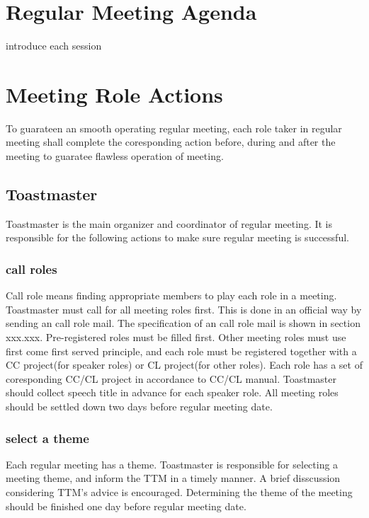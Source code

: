 \section{Regular Meeting Agenda}

introduce each session


\section{Meeting Role Actions}

To guarateen an smooth operating regular meeting, each role taker 
in regular meeting shall complete the coresponding action before,
during and after the meeting to guaratee flawless operation of 
meeting. 

\subsection{Toastmaster}

Toastmaster is the main organizer and coordinator of regular meeting. 
It is responsible for the following actions to make sure regular meeting 
is successful.

\subsubsection{call roles}

Call role means finding appropriate members to play each role in a meeting. 
Toastmaster must call for all meeting roles first. This is done in an official
way by sending an call role mail. The specification of an call role mail is shown
in section xxx.xxx. Pre-registered roles must be filled first. Other meeting roles
must use first come first served principle, and each role must be registered together
with a CC project(for speaker roles) or CL project(for other roles). Each role has 
a set of coresponding CC/CL project in accordance to CC/CL manual. Toastmaster 
should collect speech title in advance for each speaker role. All meeting roles
should be settled down two days before regular meeting date. 

\subsubsection{select a theme}
Each regular meeting has a theme. Toastmaster is responsible for selecting a meeting
theme, and inform the TTM in a timely manner. A brief disscussion considering TTM's 
advice is encouraged. Determining the theme of the meeting should be finished one day 
before regular meeting date.

